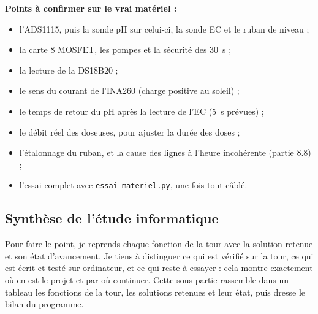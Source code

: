 \textbf{Points à confirmer sur le vrai matériel :}

\begin{itemize}
\item l'ADS1115, puis la sonde pH sur celui-ci, la sonde EC et le ruban de niveau ;
\item la carte 8 MOSFET, les pompes et la sécurité des \qty{30}{s} ;
\item la lecture de la DS18B20 ;
\item le sens du courant de l'INA260 (charge positive au soleil) ;
\item le temps de retour du pH après la lecture de l'EC (\qty{5}{s} prévues) ;
\item le débit réel des doseuses, pour ajuster la durée des doses ;
\item l'étalonnage du ruban, et la cause des lignes à l'heure incohérente (partie 8.8) ;
\item l'essai complet avec \texttt{essai\_materiel.py}, une fois tout câblé.
\end{itemize}

\subsection{Synthèse de l'étude informatique}

Pour faire le point, je reprends chaque fonction de la tour avec la solution retenue et son état d'avancement. Je tiens à distinguer ce qui est vérifié sur la tour, ce qui est écrit et testé sur ordinateur, et ce qui reste à essayer : cela montre exactement où en est le projet et par où continuer. Cette sous-partie rassemble dans un tableau les fonctions de la tour, les solutions retenues et leur état, puis dresse le bilan du programme.


